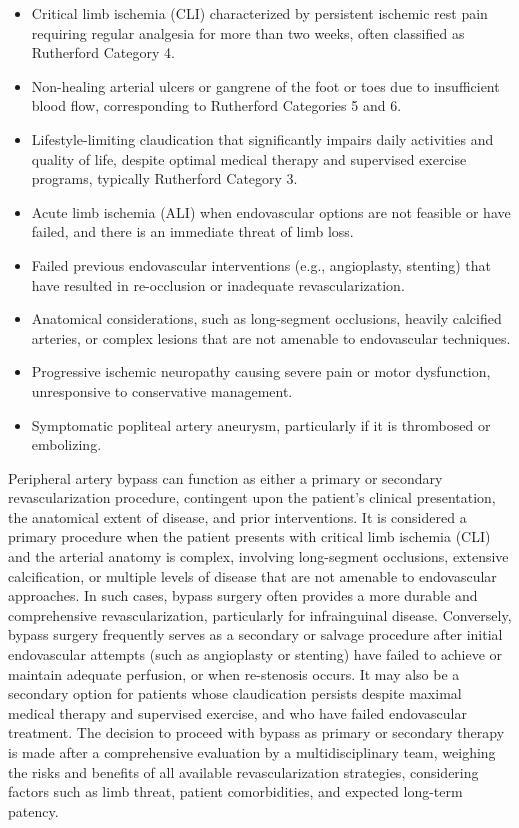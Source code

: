 \begin{itemize}
  \item Critical limb ischemia (CLI) characterized by persistent ischemic rest pain requiring regular analgesia for more than two weeks, often classified as Rutherford Category 4.
  \item Non-healing arterial ulcers or gangrene of the foot or toes due to insufficient blood flow, corresponding to Rutherford Categories 5 and 6.
  \item Lifestyle-limiting claudication that significantly impairs daily activities and quality of life, despite optimal medical therapy and supervised exercise programs, typically Rutherford Category 3.
  \item Acute limb ischemia (ALI) when endovascular options are not feasible or have failed, and there is an immediate threat of limb loss.
  \item Failed previous endovascular interventions (e.g., angioplasty, stenting) that have resulted in re-occlusion or inadequate revascularization.
  \item Anatomical considerations, such as long-segment occlusions, heavily calcified arteries, or complex lesions that are not amenable to endovascular techniques.
  \item Progressive ischemic neuropathy causing severe pain or motor dysfunction, unresponsive to conservative management.
  \item Symptomatic popliteal artery aneurysm, particularly if it is thrombosed or embolizing.
\end{itemize}

Peripheral artery bypass can function as either a primary or secondary revascularization procedure, contingent upon the patient's clinical presentation, the anatomical extent of disease, and prior interventions. It is considered a primary procedure when the patient presents with critical limb ischemia (CLI) and the arterial anatomy is complex, involving long-segment occlusions, extensive calcification, or multiple levels of disease that are not amenable to endovascular approaches. In such cases, bypass surgery often provides a more durable and comprehensive revascularization, particularly for infrainguinal disease. Conversely, bypass surgery frequently serves as a secondary or salvage procedure after initial endovascular attempts (such as angioplasty or stenting) have failed to achieve or maintain adequate perfusion, or when re-stenosis occurs. It may also be a secondary option for patients whose claudication persists despite maximal medical therapy and supervised exercise, and who have failed endovascular treatment. The decision to proceed with bypass as primary or secondary therapy is made after a comprehensive evaluation by a multidisciplinary team, weighing the risks and benefits of all available revascularization strategies, considering factors such as limb threat, patient comorbidities, and expected long-term patency.

